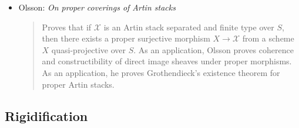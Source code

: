 \begin{itemize}
{surjectivity of the Brauer map} \cite{kresch-vistoli}
\begin{quote}
It is proved here that any smooth, separated Deligne-Mumford stack finite type
over a field with quasi-projective coarse moduli space admits a finite, flat
cover by a smooth quasi-projective scheme.
\end{quote}
\item Olsson: \emph{On proper coverings of Artin stacks} \cite{olsson_proper}
\begin{quote}
Proves that if $\mathcal{X}$ is an Artin stack separated
and finite type over $S$, then
there exists a proper surjective morphism $X \to \mathcal{X}$ from a scheme $X$
quasi-projective over $S$. As an application, Olsson proves coherence and
constructibility of direct image sheaves under proper morphisms. As an
application, he proves Grothendieck's existence theorem for proper
Artin stacks.
\end{quote}
\end{itemize}


\subsection{Rigidification}
\label{subsection-rigidification}

